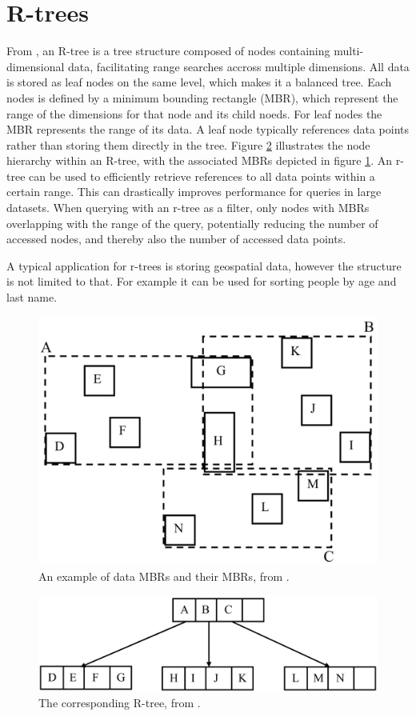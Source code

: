 \section{R-trees}
\label{sec:rtree}
From \textcite{rtree}, an R-tree is a tree structure composed of nodes containing multi-dimensional data, facilitating range searches accross multiple dimensions. All data is stored as leaf nodes on the same level, which makes it a balanced tree. Each nodes is defined by a minimum bounding rectangle (MBR), which represent the range of the dimensions for that node and its child noeds. For leaf nodes the MBR represents the range of its data. A leaf node typically references data points rather than storing them directly in the tree. Figure \ref{fig:rtree} illustrates the node hierarchy within an R-tree, with the associated MBRs depicted in figure \ref{fig:mbrs}. An r-tree can be used to efficiently retrieve references to all data points within a certain range. This can drastically improves performance for queries in large datasets. When querying with an r-tree as a filter, only nodes with MBRs overlapping with the range of the query, potentially reducing the number of accessed nodes, and thereby also the number of accessed data points.

A typical application for r-trees is storing geospatial data, however the structure is not limited to that. For example it can be used for sorting people by age and last name.

\begin{figure}
    \centering
    \includegraphics[width=0.5\linewidth]{./figures/mbrs.png}
    \caption{An example of data MBRs and their MBRs, from \cite{rtree}.}
    \label{fig:mbrs}
\end{figure}
\begin{figure}
    \centering
    \includegraphics[width=\linewidth]{./figures/rtree.png}
    \caption{The corresponding R-tree, from \cite{rtree}.}
    \label{fig:rtree}
\end{figure}

